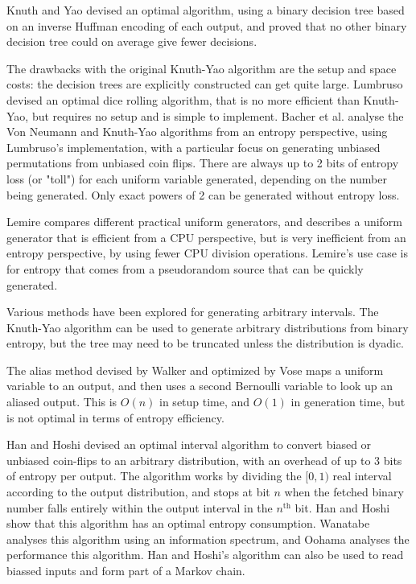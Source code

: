 \documentclass[lettersize,onecolumn]{IEEEtran}
\begin{document}
Knuth and Yao \cite{Knuth1976TheCO} devised an optimal algorithm, using a binary decision tree based on an inverse Huffman encoding \cite{huffman52} of each output, and proved that no other binary decision tree could on average give fewer decisions.

The drawbacks with the original Knuth-Yao algorithm are the setup and space costs: the decision trees are explicitly constructed can get quite large. \cite{saad2025} Lumbruso \cite{lumbroso2013optimal} devised an optimal dice rolling algorithm, that is no more efficient than Knuth-Yao, but requires no setup and is simple to implement. Bacher et al. \cite{bacher2017} analyse the Von Neumann and Knuth-Yao algorithms from an entropy perspective, using Lumbruso's implementation, with a particular focus on generating unbiased permutations from unbiased coin flips. There are always up to 2 bits of entropy loss (or "toll") for each uniform variable generated, depending on the number being generated. Only exact powers of 2 can be generated without entropy loss.

Lemire \cite{lemire2019fast} compares different practical uniform generators, and describes a uniform generator that is efficient from a CPU perspective, but is very inefficient from an entropy perspective, by using fewer CPU division operations. Lemire's use case is for entropy that comes from a pseudorandom source that can be quickly generated.

Various methods have been explored for generating arbitrary intervals.
The Knuth-Yao algorithm can be used to generate arbitrary distributions from binary entropy, but the tree may need to be truncated unless the distribution is dyadic.

The alias method devised by Walker \cite{walker1977efficient} and optimized by Vose \cite{vose91} maps a uniform variable to an output, and then uses a second Bernoulli variable to look up an aliased output. This is $O(n)$ in setup time, and $O(1)$ in generation time, but is not optimal in terms of entropy efficiency.

Han and Hoshi \cite{han97} devised an optimal interval algorithm to convert biased or unbiased coin-flips to an arbitrary distribution, with an overhead of up to 3 bits of entropy per output.  The algorithm works by dividing the $[0,1)$ real interval according to the output distribution, and stops at bit $n$ when the fetched binary number falls entirely within the output interval in the $n^\text{th}$ bit. Han and Hoshi show that this algorithm has an optimal entropy consumption. 
Wanatabe \cite{wanatabe20} analyses this algorithm using an information spectrum, and Oohama \cite{oohama11, oohama2020performance} analyses the performance this algorithm. Han and Hoshi's algorithm can also be used to read biassed inputs and form part of a Markov chain.
\end{document}
